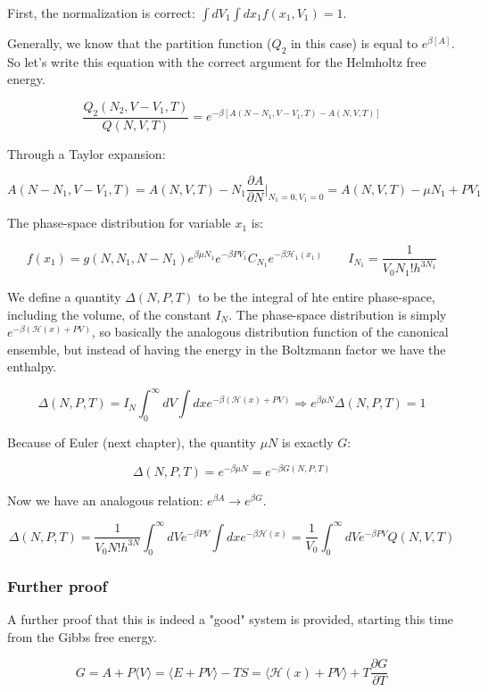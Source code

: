 	First, the normalization is correct: $\int dV_1\int dx_1f(x_1, V_1) = 1$.
	
	Generally, we know that the partition function ($Q_2$ in this case) is equal to $e^{\beta[A]}$. So let's write this equation with the correct argument for the Helmholtz free energy. 

	$$\frac{Q_2(N_2, V-V_1, T)}{Q(N, V, T)} = e^{-\beta[A(N-N_1, V-V_1, T) - A(N, V, T)]}$$

Through a Taylor expansion:

	$$A(N-N_1, V-V_1, T) = A(N, V, T)-N_1\frac{\partial A}{\partial N}|_{N_1 = 0, V_1 = 0} = A(N, V, T)-\mu N_1 + PV_1$$
	
	The phase-space distribution for variable $x_1$ is:

	$$f(x_1) = g(N, N_1, N-N_1) e^{\beta\mu N_1}e^{-\beta P V_1}C_{N_1}e^{-\beta\mathcal{H}_1(x_1)}\qquad I_{N_1} = \frac{1}{V_0N_1!h^{3N_1}}$$

	We define a quantity $\Delta(N, P, T)$ to be the integral of hte entire phase-space, including the volume, of the constant $I_N$. The phase-space distribution is simply $e^{-\beta(\mathcal{H}(x) + PV)}$, so basically the analogous distribution function of the canonical ensemble, but instead of having the energy in the Boltzmann factor we have the enthalpy. 
	
	$$\Delta(N, P, T) = I_N\int_0^{\infty}dV\int dxe^{-\beta(\mathcal{H}(x) + PV)}\Rightarrow e^{\beta\mu N}\Delta(N, P, T) = 1$$
	
	Because of Euler (next chapter), the quantity $\mu N$ is exactly $G$:

	$$\Delta(N, P, T) = e^{-\beta\mu N} = e^{-\beta G(N, P, T)}$$
	
	Now we have an analogous relation: $e^{\beta A} \rightarrow e^{\beta G}$. 
	
	$$\Delta(N, P, T) = \frac{1}{V_0N!h^{3N}}\int_0^{\infty}dVe^{-\beta PV}\int dxe^{-\beta\mathcal{H}(x)} = \frac{1}{V_0}\int_0^{\infty}dVe^{-\beta PV}Q(N, V, T)$$
	
	\subsubsection{Further proof}
	A further proof that this is indeed a "good" system is provided, starting this time from the Gibbs free energy.

	$$G = A + P\langle V \rangle = \langle E + PV\rangle - TS = \langle\mathcal{H}(x) + PV\rangle + T\frac{\partial G}{\partial T}$$


